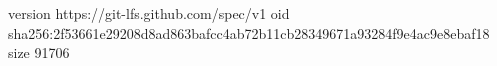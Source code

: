 version https://git-lfs.github.com/spec/v1
oid sha256:2f53661e29208d8ad863bafcc4ab72b11cb28349671a93284f9e4ac9e8ebaf18
size 91706
